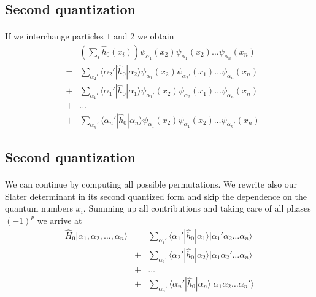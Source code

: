 \documentclass[%
twoside,                 %
final,                   %
10pt]{article}
\begin{document}
\subsection{Second quantization}

\paragraph{}
If we interchange particles $1$ and $2$  we obtain
\begin{eqnarray}
	&& \left( \sum_i \hat{h}_0(x_i) \right) \psi_{\alpha_1}(x_2)\psi_{\alpha_1}(x_2) \dots \psi_{\alpha_n}(x_n) \nonumber \\
	& =&\sum_{\alpha_2'} \langle \alpha_2'|\hat{h}_0|\alpha_2\rangle 
		\psi_{\alpha_1}(x_2)\psi_{\alpha_2'}(x_1) \dots \psi_{\alpha_n}(x_n) \nonumber \\
	&+&\sum_{\alpha_1'} \langle \alpha_1'|\hat{h}_0|\alpha_1\rangle
		\psi_{\alpha_1'}(x_2)\psi_{\alpha_2}(x_1) \dots \psi_{\alpha_n}(x_n) \nonumber \\
	&+& \dots \nonumber \\
	&+&\sum_{\alpha_n'} \langle \alpha_n'|\hat{h}_0|\alpha_n\rangle
		\psi_{\alpha_1}(x_2)\psi_{\alpha_1}(x_2) \dots \psi_{\alpha_n'}(x_n) \label{eq:2-27}
\end{eqnarray}




\subsection{Second quantization}

\paragraph{}
We can continue by computing all possible permutations. 
We rewrite also our Slater determinant in its second quantized form and skip the dependence on the quantum numbers $x_i.$
Summing up all contributions and taking care of all phases
$(-1)^p$ we arrive at 
\begin{eqnarray}
	\hat{H}_0|\alpha_1,\alpha_2,\dots, \alpha_n\rangle &=& \sum_{\alpha_1'}\langle \alpha_1'|\hat{h}_0|\alpha_1\rangle
		|\alpha_1'\alpha_2 \dots \alpha_{n}\rangle \nonumber \\
	&+& \sum_{\alpha_2'} \langle \alpha_2'|\hat{h}_0|\alpha_2\rangle
		|\alpha_1\alpha_2' \dots \alpha_{n}\rangle \nonumber \\
	&+& \dots \nonumber \\
	&+& \sum_{\alpha_n'} \langle \alpha_n'|\hat{h}_0|\alpha_n\rangle
		|\alpha_1\alpha_2 \dots \alpha_{n}'\rangle \label{eq:2-28}
\end{eqnarray}
\end{document}
